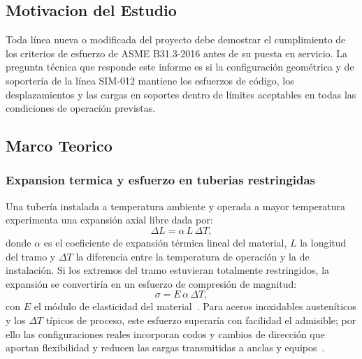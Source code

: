 \subsection{Motivacion del Estudio}

Toda l\'{i}nea nueva o modificada del proyecto debe demostrar el cumplimiento de
los criterios de esfuerzo de ASME B31.3-2016 antes de su puesta en servicio.
La pregunta t\'{e}cnica que responde este informe es si la configuraci\'{o}n
geom\'{e}trica y de soporter\'{i}a de la l\'{i}nea SIM-012 mantiene los esfuerzos
de c\'{o}digo, los desplazamientos y las cargas en soportes dentro de l\'{i}mites
aceptables en todas las condiciones de operaci\'{o}n previstas.

\subsection{Marco Teorico}
\label{ssec:marco}

\subsubsection{Expansion termica y esfuerzo en tuberias restringidas}

Una tuber\'{i}a instalada a temperatura ambiente y operada a mayor temperatura
experimenta una expansi\'{o}n axial libre dada por:
\begin{equation}
    \Delta L = \alpha \, L \, \Delta T,
    \label{eq:expansion}
\end{equation}
donde $\alpha$ es el coeficiente de expansi\'{o}n t\'{e}rmica lineal del material,
$L$ la longitud del tramo y $\Delta T$ la diferencia entre la temperatura de
operaci\'{o}n y la de instalaci\'{o}n. Si los extremos del tramo estuvieran
totalmente restringidos, la expansi\'{o}n se convertir\'{i}a en un esfuerzo de
compresi\'{o}n de magnitud:
\begin{equation}
    \sigma = E \, \alpha \, \Delta T,
    \label{eq:esfuerzo_termico}
\end{equation}
con $E$ el m\'{o}dulo de elasticidad del material~\cite{toolbox_thermal_stress}. Para aceros inoxidables
austen\'{i}ticos y los $\Delta T$ t\'{i}picos de proceso, este esfuerzo superar\'{i}a
con facilidad el admisible; por ello las configuraciones reales incorporan codos
y cambios de direcci\'{o}n que aportan flexibilidad y reducen las cargas
transmitidas a anclas y equipos~\cite{peng_pipe_stress}.

